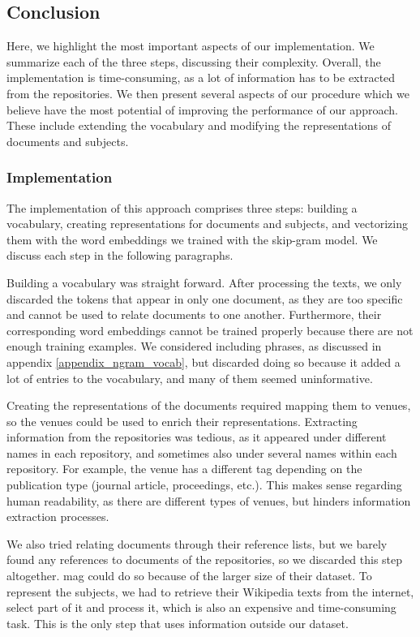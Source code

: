 \subsection{Conclusion} \label{unsupervised_approach_conclusion}

Here, we highlight the most important aspects of our implementation. We summarize each of the three steps, discussing their complexity. Overall, the implementation is time-consuming, as a lot of information has to be extracted from the repositories. We then present several aspects of our procedure which we believe have the most potential of improving the performance of our approach. These include extending the vocabulary and modifying the representations of documents and subjects.

\subsubsection{Implementation}

The implementation of this approach comprises three steps: building a vocabulary, creating representations for documents and subjects, and vectorizing them with the word embeddings we trained with the skip-gram model. We discuss each step in the following paragraphs.

Building a vocabulary was straight forward. After processing the texts, we only discarded the tokens that appear in only one document, as they are too specific and cannot be used to relate documents to one another. Furthermore, their corresponding word embeddings cannot be trained properly because there are not enough training examples. We considered including phrases, as discussed in appendix \ref{appendix_ngram_vocab}, but discarded doing so because it added a lot of entries to the vocabulary, and many of them seemed uninformative.

Creating the representations of the documents required mapping them to venues, so the venues could be used to enrich their representations. Extracting information from the repositories was tedious, as it appeared under different names in each repository, and sometimes also under several names within each repository. For example, the venue has a different tag depending on the publication type (journal article, proceedings, etc.). This makes sense regarding human readability, as there are different types of venues, but hinders information extraction processes.

We also tried relating documents through their reference lists, but we barely found any references to documents of the repositories, so we discarded this step altogether. \acrshort{mag} could do so because of the larger size of their dataset. To represent the subjects, we had to retrieve their Wikipedia texts from the internet, select part of it and process it, which is also an expensive and time-consuming task. This is the only step that uses information outside our dataset.

